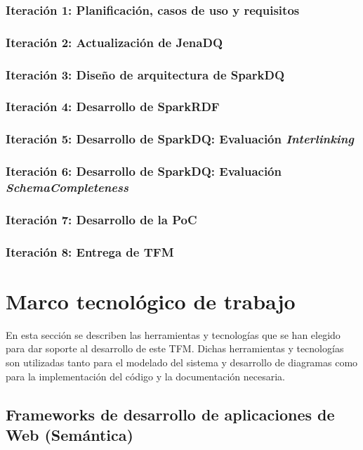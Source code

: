 \subsubsection{Iteración 1: Planificación, casos de uso y requisitos}
\subsubsection{Iteración 2: Actualización de JenaDQ}
\subsubsection{Iteración 3: Diseño de arquitectura de SparkDQ}
\subsubsection{Iteración 4: Desarrollo de SparkRDF}
\subsubsection{Iteración 5: Desarrollo de SparkDQ: Evaluación \textit{Interlinking}}
\subsubsection{Iteración 6: Desarrollo de SparkDQ: Evaluación \textit{SchemaCompleteness}}
\subsubsection{Iteración 7: Desarrollo de la PoC}
\subsubsection{Iteración 8: Entrega de \acs{TFM}}

\section{Marco tecnológico de trabajo}

\label{sec:marcotrabajo}

En esta sección se describen las herramientas y tecnologías que se han elegido
para dar soporte al desarrollo de este \acs{TFM}. Dichas herramientas y tecnologías
son utilizadas tanto para el modelado del sistema y desarrollo de diagramas como
para la implementación del código y la documentación necesaria. 

\subsection{Frameworks de desarrollo de aplicaciones de Web (Semántica)}

